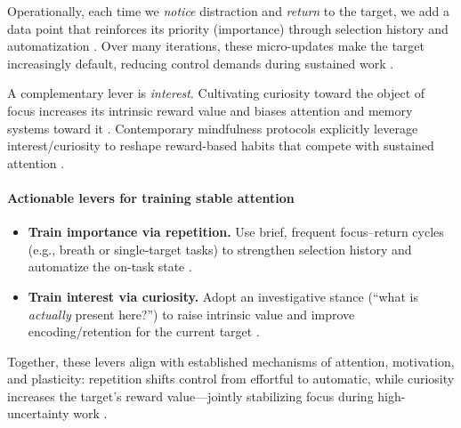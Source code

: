 Operationally, each time we \emph{notice} distraction and \emph{return} to the target, we add a data point that reinforces its priority (importance) through selection history and automatization \cite{awh2012, logan1988}.
Over many iterations, these micro-updates make the target increasingly default, reducing control demands during sustained work \cite{shiffrin1977, langner2013}.

A complementary lever is \emph{interest}.
Cultivating curiosity toward the object of focus increases its intrinsic reward value and biases attention and memory systems toward it \cite{gottlieb2013, gruber2014, kang2009}.
Contemporary mindfulness protocols explicitly leverage interest/curiosity to reshape reward-based habits that compete with sustained attention \cite{brewer2013}.

\paragraph{Actionable levers for training stable attention}
\begin{itemize}[leftmargin=*]
  \item \textbf{Train importance via repetition.} Use brief, frequent focus--return cycles (e.g., breath or single-target tasks) to strengthen selection history and automatize the on-task state \cite{shiffrin1977, logan1988, awh2012, maclean2010}.
  \item \textbf{Train interest via curiosity.} Adopt an investigative stance (``what is \emph{actually} present here?'') to raise intrinsic value and improve encoding/retention for the current target \cite{gottlieb2013, gruber2014, kang2009, brewer2013}.
\end{itemize}

Together, these levers align with established mechanisms of attention, motivation, and plasticity: repetition shifts control from effortful to automatic, while curiosity increases the target's reward value---jointly stabilizing focus during high-uncertainty work \cite{pessoa2009, dayan2011, langner2013}.
